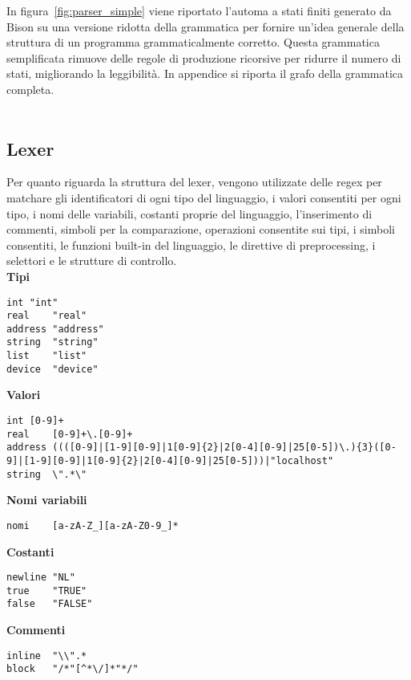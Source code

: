 \documentclass[10pt]{article}
\begin{document}
In figura~\ref{fig:parser_simple} viene riportato l'automa a stati finiti generato da Bison su una versione ridotta della grammatica per fornire un'idea generale della struttura di un programma grammaticalmente corretto. Questa grammatica semplificata rimuove delle regole di produzione ricorsive per ridurre il numero di stati, migliorando la leggibilità. In appendice si riporta il grafo della grammatica completa.\\\\

\subsection{Lexer}

Per quanto riguarda la struttura del lexer, vengono utilizzate delle regex per matchare gli identificatori di ogni tipo del linguaggio, i valori consentiti per ogni tipo, i nomi delle variabili, costanti proprie del linguaggio, l'inserimento di commenti, simboli per la comparazione, operazioni consentite sui tipi, i simboli consentiti, le funzioni built-in del linguaggio, le direttive di preprocessing, i selettori e le strutture di controllo.\\

\textbf{Tipi}
\begin{lstlisting}[breaklines=true, postbreak=\mbox{{$\hookrightarrow$}\space}]
int	"int"
real	"real"
address	"address"
string	"string"
list	"list"
device	"device"
\end{lstlisting}

\textbf{Valori}
\begin{lstlisting}[breaklines=true, postbreak=\mbox{{$\hookrightarrow$}\space}]
int	[0-9]+
real	[0-9]+\.[0-9]+
address	((([0-9]|[1-9][0-9]|1[0-9]{2}|2[0-4][0-9]|25[0-5])\.){3}([0-9]|[1-9][0-9]|1[0-9]{2}|2[0-4][0-9]|25[0-5]))|"localhost"
string	\".*\"
\end{lstlisting}

\textbf{Nomi variabili}
\begin{lstlisting}[breaklines=true, postbreak=\mbox{{$\hookrightarrow$}\space}]
nomi	[a-zA-Z_][a-zA-Z0-9_]*
\end{lstlisting}

\textbf{Costanti}
\begin{lstlisting}[breaklines=true, postbreak=\mbox{{$\hookrightarrow$}\space}]
newline	"NL"
true	"TRUE"
false	"FALSE"
\end{lstlisting}

\textbf{Commenti}
\begin{lstlisting}[breaklines=true, postbreak=\mbox{{$\hookrightarrow$}\space}]
inline	"\\".*
block	"/*"[^*\/]*"*/"
\end{lstlisting}
\end{document}
